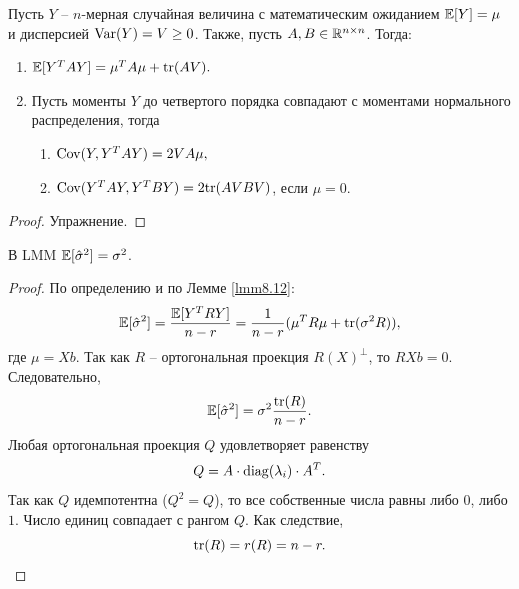\begin{lmm} \label{lmm8.12}
	Пусть $Y$ -- $n$-мерная случайная величина с математическим ожиданием $\mathbb{E}[Y]=\mu$ и дисперсией $\mathrm{Var}(Y)=V\geq 0$. Также, пусть $A,B \in \mathbb{R}^{n \times n}$. Тогда:
	\begin{enumerate}
		\item $\mathbb{E}[Y^TAY]=\mu^TA\mu + \mathrm{tr}(AV).$
		\item Пусть моменты $Y$ до четвертого порядка совпадают с моментами нормального распределения, тогда
		\begin{enumerate}
			\item $\mathrm{Cov}(Y, Y^TAY)=2VA\mu,$
			\item $\mathrm{Cov}(Y^TAY, Y^TBY)=2 \mathrm{tr}(AVBV)$, если $\mu = 0$.
		\end{enumerate}
	\end{enumerate}
\end{lmm}
\begin{proof}
	Упражнение.
\end{proof}

\begin{crlr}\label{crlr8.13}
	В LMM $\mathbb{E}[\hat{\sigma}^2] = \sigma^2$.
\end{crlr}
\begin{proof}
	По определению и по Лемме \ref{lmm8.12}:
	\[ \mathbb{E}[\hat{\sigma}^2] = \frac{\mathbb{E}[Y^TRY]}{n-r} = \frac{1}{n-r}(\mu^T R \mu + \mathrm{tr}(\sigma^2R)),\]
	где $\mu = Xb$. Так как $R$ -- ортогональная проекция $R(X)^\perp$, то $RXb = 0$. Следовательно,
	\[ \mathbb{E}[\hat{\sigma}^2] = \sigma^2 \frac{\mathrm{tr}(R)}{n - r}. \]
	Любая ортогональная проекция $Q$ удовлетворяет равенству
	\[ Q = A\cdot \mathrm{diag}(\lambda_i) \cdot A^T.\]
	Так как $Q$ идемпотентна ($Q^2=Q$), то все собственные числа равны либо $0$, либо $1$. Число единиц совпадает с рангом $Q$. Как следствие,
	\[\mathrm{tr}(R) = r(R) = n - r. \]
\end{proof}

